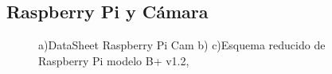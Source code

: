 \documentclass[letterpaper,12pt]{article}
\begin{document}
\subsection{ Raspberry Pi y Cámara}
\begin{figure}[H]
\centering
{}
\caption{a)DataSheet Raspberry Pi Cam b) c)Esquema reducido de Raspberry Pi modelo B+ v1.2, \cite{Datasheet}}
\label{Fig:Datasheet}
\end{figure}
\end{document}
